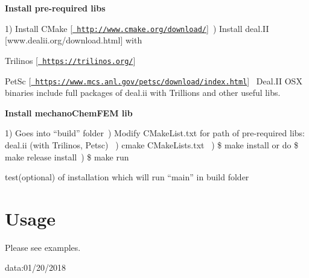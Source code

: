 \begin{DoxyEnumerate}
\item {\bfseries{Install pre-\/required libs}}~\newline


1) Install C\+Make \mbox{[}\href{http://www.cmake.org/download/}{\texttt{ http\+://www.\+cmake.\+org/download/}}\mbox{]}~) Install deal.\+II \mbox{[}www.\+dealii.\+org/download.html\mbox{]} with~\newline

\begin{DoxyItemize}
\item Trilinos \mbox{[}\href{https://trilinos.org/}{\texttt{ https\+://trilinos.\+org/}}\mbox{]}~\newline

\item Pet\+Sc \mbox{[}\href{https://www.mcs.anl.gov/petsc/download/index.html}{\texttt{ https\+://www.\+mcs.\+anl.\+gov/petsc/download/index.\+html}}\mbox{]}~\newline
 Deal.\+II O\+SX binaries include full packages of deal.\+ii with Trillions and other useful libs.
\end{DoxyItemize}
\item {\bfseries{Install mechano\+Chem\+F\+EM lib}}~\newline


1) Goes into “build” folder~) Modify C\+Make\+List.\+txt for path of pre-\/required libs\+: deal.\+ii (with Trilinos, Petsc) ~) cmake C\+Make\+Lists.\+txt ~) \$ make install or do \$ make release install~) \$ make run ~\newline

\begin{DoxyItemize}
\item test(optional) of installation which will run “main” in build folder ~\newline

\end{DoxyItemize}
\end{DoxyEnumerate}

\section*{{\bfseries{Usage}}~\newline
 }

Please see examples.

data\+:01/20/2018 